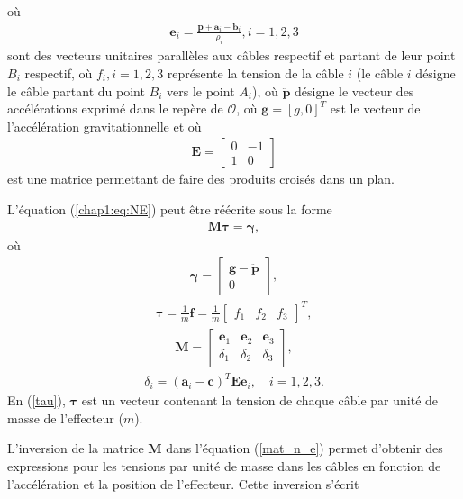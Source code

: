 où 
\begin{align}
\mathbf{e}_i=\frac{\mathbf{p}+\mathbf{a}_i-\mathbf{b}_i}{\rho_i},i=1,2,3 \label{u_length}
\end{align}
sont des vecteurs unitaires parallèles aux câbles respectif et partant de leur point $B_i$ respectif, où $f_i, i=1,2,3$ représente la tension de la câble $i$ (le câble $i$ désigne le câble partant du point $B_i$ vers le point $A_i$), où $\ddot{\mathbf{p}}$ désigne le vecteur des accélérations exprimé dans le repère de $\mathcal{O}$, où $\mathbf{g}=[g,0]^T$ est le vecteur de l'accélération gravitationnelle et où 
\begin{align}
\mathbf{E}=\begin{bmatrix}
0 & -1\\1 & 0
\end{bmatrix}
\end{align} 
est une matrice permettant de faire des produits croisés dans un plan. \par
L'équation (\ref{chap1:eq:NE}) peut être réécrite sous la forme
\begin{align}
\mathbf{M}\bm{\tau}=\bm{\gamma} \label{mat_n_e},
\end{align}
où
\begin{align} \bm{\gamma} =\begin{bmatrix} \mathbf{g-\ddot{p}}\\0 \end{bmatrix}, \label{gamma} \end{align} \begin{align} \bm{\tau} = \frac{1}{m}\mathbf{f}=\frac{1}{m}\begin{bmatrix} f_1 & f_2 & f_3 \end{bmatrix}^T, \label{tau} \end{align} \begin{align} \mathbf{M}=\begin{bmatrix} \mathbf{e}_1 & \mathbf{e}_2 & \mathbf{e}_3\\
\delta_1 &\delta_2 &    \delta_3 \end{bmatrix},
\label{M}\end{align}
\begin{align}
\delta_i=(\mathbf{a}_i-\mathbf{c})^T\mathbf{E}\mathbf{e}_i,\quad i=1,2,3.\label{alpha}
\end{align}
En (\ref{tau}), $\bm{\tau}$ est un vecteur contenant la tension de chaque câble par unité de masse de l'effecteur ($m$). \par 
L'inversion de la matrice $\mathbf{M}$ dans l'équation (\ref{mat_n_e}) permet d'obtenir des expressions pour les tensions par unité de masse dans les câbles en fonction de l'accélération et la position de l'effecteur. Cette inversion s'écrit
